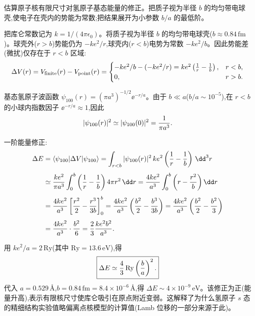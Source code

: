 \begin{question}
估算原子核有限尺寸对氢原子基态能量的修正。把质子视为半径 $b$ 的均匀带电球壳,使电子在壳内的势能为常数;把结果展开为小参数 $b/a$ 的最低阶。
\begin{solution}
把库仑常数记为 $k=1/(4\pi\epsilon_0)$。将质子视为半径 $b$ 的均匀带电球壳($b\approx0.84\,\mathrm{fm}$)。球壳外($r>b$)势能仍为 $-ke^2/r$,球壳内($r<b$)电势为常数 $-ke^2/b$。因此势能差(微扰)仅存在于 $r<b$ 区域:
\[
\Delta V(r)=V_{\rm finite}(r)-V_{\rm point}(r)=\begin{cases}
-ke^2/b - (-ke^2/r) = ke^2\left({1\over r}-{1\over b}\right), & r<b,\\
0, & r>b.
\end{cases}
\]

基态氢原子波函数 $\psi_{100}(r)=(\pi a^3)^{-1/2}\ee^{-r/a}$。由于 $b\ll a$($b/a\sim10^{-5}$),在 $r<b$ 的小球内指数因子 $\ee^{-r/a}\approx 1$,因此
\[
|\psi_{100}(r)|^2 \simeq |\psi_{100}(0)|^2 = {1\over\pi a^3}.
\]

一阶能量修正:
\[
\begin{aligned}
\Delta E &= \langle\psi_{100}|\Delta V|\psi_{100}\rangle
= \int_{r<b} |\psi_{100}(r)|^2\,ke^2\left({1\over r}-{1\over b}\right)\,\dd^3r \\[4pt]
&\simeq {ke^2\over\pi a^3}\int_0^b\left({1\over r}-{1\over b}\right)4\pi r^2\,\dd r
= {4ke^2\over a^3}\int_0^b\left(r-{r^2\over b}\right)\dd r \\[4pt]
&= {4ke^2\over a^3}\left[{r^2\over2}-{r^3\over3b}\right]_0^b
= {4ke^2\over a^3}\left({b^2\over2}-{b^3\over3b}\right)
= {4ke^2\over a^3}\left({b^2\over2}-{b^2\over3}\right) \\[4pt]
&= {4ke^2\over a^3}\cdot{b^2\over6}
= {2\over3}{ke^2 b^2\over a^3}.
\end{aligned}
\]

用 $ke^2/a = 2\,\mathrm{Ry}$(其中 $\mathrm{Ry}=13.6\,\mathrm{eV}$),得
\[
\boxed{\Delta E \simeq {4\over3}\,\mathrm{Ry}\left({b\over a}\right)^2.}
\]
代入 $a=0.529\,\text{\AA}$,$b=0.84\,\mathrm{fm}=8.4\times10^{-6}\,\text{\AA}$,得 $\Delta E\sim 4\times10^{-9}\,\mathrm{eV}$。该修正为正(能量升高),表示有限核尺寸使库仑吸引在原点附近变弱。这解释了为什么氢原子 $s$ 态的精细结构实验值略偏离点核模型的计算值(Lamb 位移的一部分来源于此)。
\end{solution}
\end{question}

